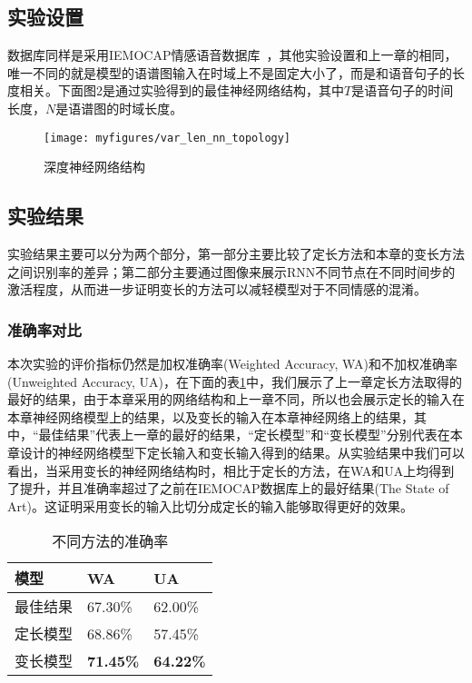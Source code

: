 \subsection{实验设置}
\label{sec:var_len_experiement_setup}

数据库同样是采用IEMOCAP情感语音数据库~\cite{Busso2008IEMOCAP}，其他实验设置和上一章的相同，唯一不同的就是模型的语谱图输入在时域上不是固定大小了，而是和语音句子的长度相关。下面图2是通过实验得到的最佳神经网络结构，其中$T$是语音句子的时间长度，$N$是语谱图的时域长度。

\begin{figure}[htb] %
    \centering
    \texttt{[image: myfigures/var\_len\_nn\_topology]}
    \caption{深度神经网络结构}
    \label{fig:var_len_nn_topology}
\end{figure}

\subsection{实验结果}
\label{sec:var_len_experiement_result}

实验结果主要可以分为两个部分，第一部分主要比较了定长方法和本章的变长方法之间识别率的差异；第二部分主要通过图像来展示RNN不同节点在不同时间步的激活程度，从而进一步证明变长的方法可以减轻模型对于不同情感的混淆。

\subsubsection{准确率对比}
\label{sec:var_len_experiement_acc}
本次实验的评价指标仍然是加权准确率(Weighted Accuracy, WA)和不加权准确率(Unweighted Accuracy, UA)，在下面的表\ref{tab:acc_var_len}中，我们展示了上一章定长方法取得的最好的结果，由于本章采用的网络结构和上一章不同，所以也会展示定长的输入在本章神经网络模型上的结果，以及变长的输入在本章神经网络上的结果，其中，“最佳结果”代表上一章的最好的结果，“定长模型”和“变长模型”分别代表在本章设计的神经网络模型下定长输入和变长输入得到的结果。从实验结果中我们可以看出，当采用变长的神经网络结构时，相比于定长的方法，在WA和UA上均得到了提升，并且准确率超过了之前在IEMOCAP数据库上的最好结果(The State of Art)。这证明采用变长的输入比切分成定长的输入能够取得更好的效果。
\begin{table}[htb]
\centering
\begin{minipage}[t]{0.8\linewidth} %
\caption{不同方法的准确率}
\label{tab:acc_var_len}
    \begin{tabularx}{\linewidth}{X<{\centering} X<{\centering} X<{\centering}}
        \toprule[1.5pt]
        模型 & WA & UA \\
        \midrule[1pt]
        最佳结果 & 67.30\% & 62.00\% \\
        定长模型 & 68.86\% & 57.45\% \\
        变长模型 & \textbf{71.45\%} & \textbf{64.22\%} \\
        \bottomrule[1.5pt]
    \end{tabularx}
\end{minipage}
\end{table}

